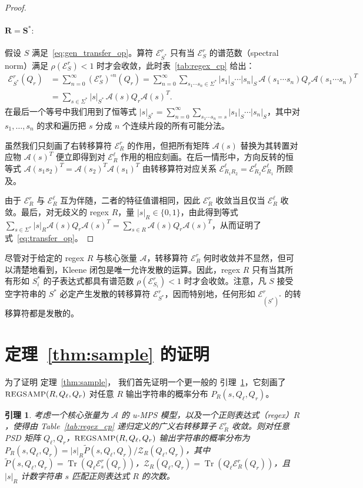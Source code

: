 \documentclass[twoside]{article}
\newtheorem{lemma}{引理}
\newcommand{\Sample}{\textsc{\small REGSAMP}}
\DeclareMathOperator{\Tr}{Tr}
\newcommand{\EL}{\mc{E}^{\scriptstyle \ell}}
\newcommand{\ER}{\mc{E}^{\scriptstyle r}}
\newcommand{\QL}{Q_{\ell}}
\newcommand{\QR}{Q_{r}}
\newcommand{\sR}{|s|_R}
\newcommand{\Pt}{\tilde{P}}
\newcommand{\mc}[1]{\mathcal{#1}}
\begin{document}
\begin{proof}
\paragraph{$\mathbf{R = S^*:}$} 假设 $S$ 满足~\eqref{eq:gen_transfer_op}。算符 $\ER_{S^*}$ 只有当 $\ER_S$ 的谱范数（spectral norm）满足 $\rho(\ER_S) < 1$ 时才会收敛，此时表~\ref{tab:regex_cp}
给出：
%
\begin{align*}
    \ER_{S^*}(\QR) &= \sum_{n=0}^\infty (\ER_{S})^{\circ n}(\QR) = \sum_{n=0}^\infty \sum_{s_1\cdots s_n \in \Sigma^*} |s_1|_{S} \cdots |s_n|_S\, \mc{A}(s_1 \cdots s_n) \QR \mc{A}(s_1 \cdots s_n)^T \\
    &= \sum_{s \in \Sigma^*} |s|_{S^*}\, \mc{A}(s) \QR \mc{A}(s)^T.
\end{align*}
%
在最后一个等号中我们用到了恒等式 $|s|_{S^*} = \sum_{n=0}^\infty \sum_{s_1 \cdots s_n = s} |s_1|_{S} \cdots |s_n|_{S}$，其中对 $s_1, \ldots, s_n$ 的求和遍历把 $s$ 分成 $n$ 个连续片段的所有可能分法。

虽然我们只刻画了右转移算符 $\ER_R$ 的作用，但把所有矩阵 $\mc{A}(s)$ 替换为其转置对应物 $\mc{A}(s)^T$ 便立即得到对 $\EL_R$ 作用的相应刻画。在后一情形中，方向反转的恒等式 $\mc{A}(s_1 s_2)^T = \mc{A}(s_2)^T \mc{A}(s_1)^T$ 由转移算符对应关系 $\EL_{R_1 R_2} = \EL_{R_2}\EL_{R_1}$ 所顾及。

由于 $\ER_R$ 与 $\EL_R$ 互为伴随，二者的特征值谱相同，因此 $\ER_R$ 收敛当且仅当 $\EL_R$ 收敛。最后，对无歧义的 regex $R$，量 $\sR \in \{0, 1\}$，由此得到等式 $\sum_{s\in \Sigma^*} \sR \mc{A}(s) \QR \mc{A}(s)^T = \sum_{s\in R} \mc{A}(s) \QR \mc{A}(s)^T$，从而证明了式~\ref{eq:transfer_op}。

\end{proof}

尽管对于给定的 regex $R$ 与核心张量 $\mc{A}$，转移算符 $\ER_R$ 何时收敛并不显然，但可以清楚地看到，Kleene 闭包是唯一允许发散的运算。因此，regex $R$ 只有当其所有形如 $S_i^*$ 的子表达式都具有谱范数 $\rho(\ER_{S_i}) < 1$ 时才会收敛。注意，凡 $S$ 接受空字符串的 $S^*$ 必定产生发散的转移算符 $\ER_{S^*}$，因而特别地，任何形如 $\ER_{(S^*)^*}$ 的转移算符都是发散的。

\section{定理~\ref{thm:sample} 的证明}
\label{sec:appendix_b}

为了证明 定理~\ref{thm:sample}，
我们首先证明一个更一般的 引理~\ref{lem:sample}，它刻画了 $\Sample(R, \QL, \QR)$ 对任意 $R$ 输出字符串的概率分布 $P_R(s, \QL, \QR)$。
%
\begin{lemma}
\label{lem:sample}
考虑一个核心张量为 $\mc{A}$ 的 u-MPS 模型，以及一个正则表达式（regex）$R$，使得由 Table~\ref{tab:regex_cp} 递归定义的广义右转移算子 $\ER_R$
收敛。则对任意 PSD 矩阵 $\QL, \QR$，$\Sample(R, \QL, \QR)$ 输出字符串的概率分布为 $P_R(s, \QL, \QR) = \sR \Pt(s, \QL, \QR) / \mc{Z}_R(\QL, \QR)$，其中 $\Pt(s, \QL, \QR) = \Tr(\QL \ER_s(\QR))$，$\mc{Z}_R(\QL, \QR) = \Tr(\QL \ER_R(\QR))$，且 $\sR$ 计数字符串 $s$ 匹配正则表达式 $R$ 的次数。
\end{lemma}
\end{document}
